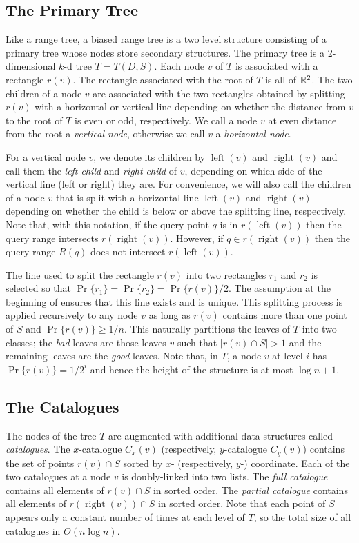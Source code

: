 \documentclass[lotsofwhite,charterfonts]{patmorin}
\DeclareMathOperator{\lft}{left}
\DeclareMathOperator{\rght}{right}
\begin{document}
\subsection{The Primary Tree}

Like a range tree, a biased range tree is a two level structure
consisting of a primary tree whose nodes store secondary structures.
The primary tree is a 2-dimensional $k$-d tree \cite{X} $T=T(D,S)$.
Each node $v$ of $T$ is associated with a rectangle $r(v)$.  The
rectangle associated with the root of $T$ is all of $\mathbb{R}^2$. The two
children of a node $v$ are associated with the two rectangles obtained
by splitting $r(v)$ with a horizontal or vertical line depending on
whether the distance from $v$ to the root of $T$ is even or odd,
respectively.  We call a node $v$ at even distance from the root a
\emph{vertical node}, otherwise we call $v$ a \emph{horizontal node}.

For a vertical node $v$, we denote its children by $\lft(v)$ and
$\rght(v)$ and call them the \emph{left child} and \emph{right child}
of $v$, depending on which side of the vertical line (left or right)
they are.  For convenience, we will also call the children of a node
$v$ that is split with a horizontal line $\lft(v)$ and $\rght(v)$
depending on whether the child is below or above the splitting line,
respectively.  Note that, with this notation, if the query point $q$
is in $r(\lft(v))$ then the query range intersects $r(\rght(v))$.
However, if $q\in r(\rght(v))$ then the query range $R(q)$ does not
intersect $r(\lft(v))$.

The line used to split the rectangle $r(v)$ into two rectangles $r_1$
and $r_2$ is selected so that $\Pr\{r_1\}=\Pr\{r_2\}=\Pr\{r(v)\}/2$.
The assumption at the beginning of  ensures
that this line exists and is unique. This splitting process is applied
recursively to any node $v$ as long as $r(v)$ contains more than one
point of $S$ and $\Pr\{r(v)\} \ge 1/n$.  This naturally partitions the
leaves of $T$ into two classes; the \emph{bad} leaves are those leaves
$v$ such that $|r(v)\cap S| > 1$ and the remaining leaves are the
\emph{good} leaves.  Note that, in $T$, a node $v$ at level $i$ has
$\Pr\{r(v)\}=1/2^i$ and hence the height of the structure is at most
$\log n+1$.

\subsection{The Catalogues}

The nodes of the tree $T$ are augmented with additional data
structures called \emph{catalogues}.  The $x$-catalogue $C_x(v)$
(respectively, $y$-catalogue $C_y(v)$) contains the set of points
$r(v)\cap S$ sorted by $x$- (respectively, $y$-) coordinate.
Each of the two catalogues at a node $v$ is doubly-linked into two
lists.  The \emph{full catalogue} contains all elements of $r(v)\cap
S$ in sorted order. The \emph{partial catalogue} contains all elements
of $r(\rght(v))\cap S$ in sorted order.  Note that each point of $S$
appears only a constant number of times at each level of $T$, so the
total size of all catalogues in $O(n\log n)$.
\end{document}
